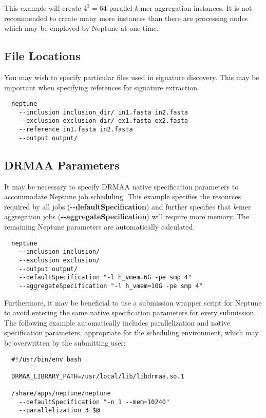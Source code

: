 \documentclass[a4paper,10pt]{article}
\begin{document}
This example will create \(4^3 = 64\) parallel \textit{k}-mer aggregation instances. It is not recommended to create many more instances than there are processing nodes which may be employed by Neptune at one time.

\subsection{File Locations}

You may wish to specify particular files used in signature discovery. This may be important when specifying references for signature extraction.

\begin{verbatim}
  neptune
    --inclusion inclusion_dir/ in1.fasta in2.fasta
    --exclusion exclusion_dir/ ex1.fasta ex2.fasta
    --reference in1.fasta in2.fasta    
    --output output/
\end{verbatim}

\subsection{DRMAA Parameters}

It may be necessary to specify DRMAA native specification parameters to accommodate Neptune job scheduling. This example specifies the resources required by all jobs (\mbox{\textbf{-{}-defaultSpecification}}) and further specifies that \textit{k}-mer aggregation jobs (\mbox{\textbf{-{}-aggregateSpecification}}) will require more memory. The remaining Neptune parameters are automatically calculated.

\begin{verbatim}
  neptune
    --inclusion inclusion/
    --exclusion exclusion/
    --output output/
    --defaultSpecification "-l h_vmem=6G -pe smp 4"
    --aggregateSpecification "-l h_vmem=10G -pe smp 4"
\end{verbatim}

Furthermore, it may be beneficial to use a submission wrapper script for Neptune to avoid entering the same native specification parameters for every submission. The following example automatically includes parallelization and native specification parameters, appropriate for the scheduling environment, which may be overwritten by the submitting user:

\begin{verbatim}
  #!/usr/bin/env bash

  DRMAA_LIBRARY_PATH=/usr/local/lib/libdrmaa.so.1

  /share/apps/neptune/neptune
    --defaultSpecification "-n 1 --mem=10240"
    --parallelization 3 $@
\end{verbatim}
\end{document}
